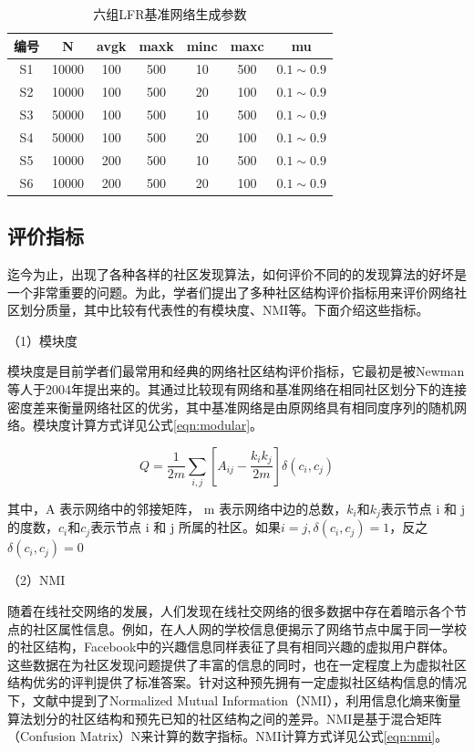\begin{table}
  \centering
  \caption{六组LFR基准网络生成参数} \label{tab:tab3-5}
  \begin{tabular*}{0.9\textwidth}{@{\extracolsep{\fill}}ccccccc}
  \toprule
    编号		&N  &avgk &maxk &minc &maxc &mu\\
  \midrule
    S1  &10000  &100 &500 &10 &500 &$0.1\sim 0.9$\\
    S2  &10000  &100 &500 &20 &100 &$0.1\sim 0.9$\\
    S3  &50000  &100 &500 &10 &500 &$0.1\sim 0.9$\\
    S4  &50000  &100 &500 &20 &100 &$0.1\sim 0.9$\\
    S5  &10000  &200 &500 &10 &500 &$0.1\sim 0.9$\\
    S6  &10000  &200 &500 &20 &100 &$0.1\sim 0.9$\\
  \bottomrule
  \end{tabular*}
\end{table}

\subsection{评价指标}
迄今为止，出现了各种各样的社区发现算法，如何评价不同的的发现算法的好坏是一个非常重要的问题。为此，学者们提出了多种社区结构评价指标用来评价网络社区划分质量，其中比较有代表性的有模块度、NMI等。下面介绍这些指标。

（1）模块度

模块度是目前学者们最常用和经典的网络社区结构评价指标，它最初是被Newman等人于2004年提出来的\cite{2002Community}。其通过比较现有网络和基准网络在相同社区划分下的连接密度差来衡量网络社区的优劣，其中基准网络是由原网络具有相同度序列的随机网络。模块度计算方式详见公式\ref{eqn:modular}。

\begin{equation}
  \label{eqn:modular}
  Q=\frac{1}{2m}\sum_{i,j}\left [ A_{ij}-\frac{k_ik_j}{2m} \right ]\delta (c_i, c_j)  
\end{equation}

其中，A 表示网络中的邻接矩阵， m 表示网络中边的总数，$k_i$和$k_j$表示节点 i 和 j 的度数，$c_i$和$c_j$表示节点 i 和 j 所属的社区。如果$i=j,\delta(c_i,c_j)=1$，反之$\delta(c_i,c_j)=0$

（2）NMI

随着在线社交网络的发展，人们发现在线社交网络的很多数据中存在着暗示各个节点的社区属性信息。例如，在人人网的学校信息便揭示了网络节点中属于同一学校的社区结构，Facebook中的兴趣信息同样表征了具有相同兴趣的虚拟用户群体。这些数据在为社区发现问题提供了丰富的信息的同时，也在一定程度上为虚拟社区结构优劣的评判提供了标准答案。针对这种预先拥有一定虚拟社区结构信息的情况下，文献\cite{Peng2014Weighting}中提到了Normalized Mutual Information（NMI），利用信息化熵来衡量算法划分的社区结构和预先已知的社区结构之间的差异。NMI是基于混合矩阵（Confusion Matrix）N来计算的数字指标。NMI计算方式详见公式\ref{eqn:nmi}。

